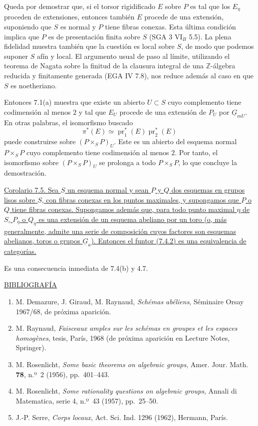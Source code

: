 Queda por demostrar que, si el torsor rigidificado $E$ sobre $P$ es tal
que los $E_\eta$ proceden de extensiones, entonces también $E$ procede
de una extensión, suponiendo que $S$ es normal y $P$ tiene fibras
conexas. Esta última condición implica que $P$ es de presentación
finita sobre $S$ (SGA 3 $\mathrm{VI}_B$ 5.5). La plena fidelidad muestra
también que la cuestión es local sobre $S$, de modo que podemos suponer
$S$ afín y local. El argumento usual de paso al límite, utilizando el
teorema de Nagata sobre la finitud de la clausura integral de una
$\mathbb Z$-álgebra reducida y finitamente generada (EGA IV 7.8), nos
reduce además al caso en que $S$ es noetheriano.


Entonces 7.1(a) muestra que existe un abierto $U\subset S$ cuyo
complemento tiene codimensión al menos $2$ y tal que $E_U$ procede de
una extensión de $P_U$ por $\underline G_{mU}$. En otras palabras, el
isomorfismo buscado
\[
 \pi^*(E)\simeq
 \operatorname{pr}_1^*(E)\operatorname{pr}_2^*(E)
\]
puede construirse sobre $(P\times_S P)_U$. Este es un abierto del
esquema normal $P\times_S P$ cuyo complemento tiene codimensión al menos
$2$. Por tanto, el isomorfismo sobre $(P\times_S P)_U$ se prolonga a
todo $P\times_S P$, lo que concluye la demostración.


\medskip
\noindent\underline{Corolario 7.5. Sea $S$ un esquema normal y sean $P$
y $Q$ dos esquemas en grupos lisos sobre $S$, con fibras conexas en los
puntos maximales, y supongamos que $P$ o $Q$ tiene fibras conexas.
Supongamos además que, para todo punto maximal $\eta$ de $S$, $P_\eta$
o $Q_\eta$ es una extensión de un esquema abeliano por un toro (o, más
generalmente, admite una serie de composición cuyos factores son
esquemas abelianos, toros o grupos $\underline G_a$). Entonces el funtor
(7.4.2) es una equivalencia de categorías.}

Es una consecuencia inmediata de 7.4(b) y 4.7.

\bigskip
\noindent\underline{BIBLIOGRAFÍA}

\begin{enumerate}
\item[{[1]}] M. Demazure, J. Giraud, M. Raynaud,
  \emph{Schémas abéliens}, Séminaire Orsay 1967/68, de próxima
  aparición.
\item[{[2]}] M. Raynaud, \emph{Faisceaux amples sur les schémas en
  groupes et les espaces homogènes}, tesis, París, 1968 (de próxima
  aparición en Lecture Notes, Springer).
\item[{[3]}] M. Rosenlicht, \emph{Some basic theorems on algebraic
  groups}, Amer. Jour. Math. \textbf{78}, n.º~2 (1956), pp.~401--443.
\item[{[3bis]}] M. Rosenlicht, \emph{Some rationality questions on
  algebraic groups}, Annali di Matematica, serie 4, n.º~43 (1957),
  pp.~25--50.
\item[{[4]}] J.-P. Serre, \emph{Corps locaux}, Act. Sci. Ind. 1296
  (1962), Hermann, París.
\end{enumerate}
